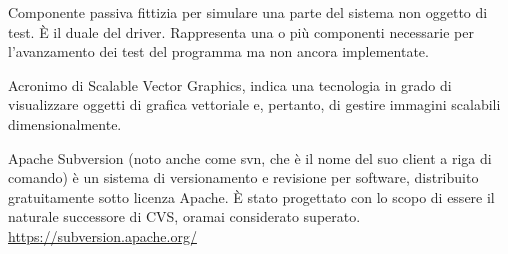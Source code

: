 Componente passiva fittizia per simulare una parte del sistema non oggetto di test. \`{E} il duale del driver. Rappresenta una o più componenti necessarie per l’avanzamento dei test del programma ma non ancora implementate.

Acronimo di Scalable Vector Graphics, indica una tecnologia in grado di visualizzare oggetti di grafica vettoriale e, pertanto, di gestire immagini scalabili dimensionalmente.

Apache Subversion (noto anche come svn, che è il nome del suo client a riga di comando) è un sistema di versionamento e revisione per software, distribuito gratuitamente sotto licenza Apache. \`{E} stato progettato con lo scopo di essere il naturale successore di CVS, oramai considerato superato.\\
\url{https://subversion.apache.org/}
\clearpage

